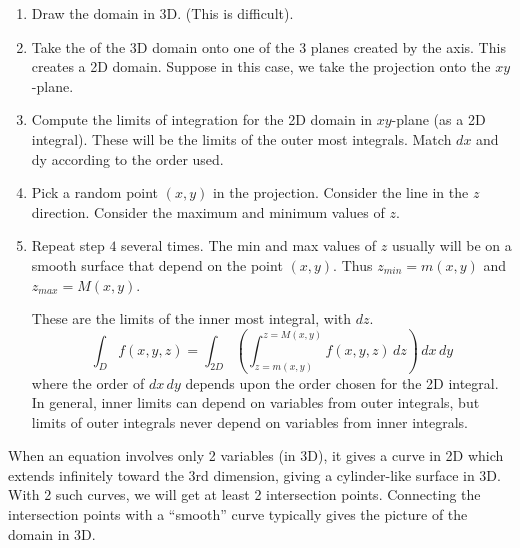 \documentclass[11pt,fleqn]{book} %
\begin{document}
\begin{enumerate}
    \item Draw the domain in 3D. (This is difficult). 

    \item Take the  of the 3D domain onto one of the 3 planes created by the axis. This creates a 2D domain. Suppose in this case, we take the projection onto the $xy$-plane.
    
    \item Compute the limits of integration for the 2D domain in $xy$-plane (as a 2D integral). These will be the limits of the outer most integrals. Match $dx$ and dy according to the order used. 
    
    \item Pick a random point $(x, y)$ in the projection. Consider the  line in the $z$ direction. Consider the maximum and minimum values of $z$. 
    
    \item Repeat step $4$ several times. The min and max values of $z$ usually will be on a smooth surface that depend on the point $(x, y)$. Thus $z_{min} = m(x, y)$ and $z_{max} = M(x, y)$.
    
    These are the limits of the inner most integral, with $dz$.
    $$\int_D f(x, y, z) = \int_{2D} \left( \int_{z=m(x,y)}^{z=M(x,y)} f(x, y, z) \,dz \right) \,dx \,dy$$
    where the order of $dx \,dy$ depends upon the order chosen for the 2D integral. In general, inner limits can depend on variables from outer integrals, but limits of outer integrals never depend on variables from inner integrals. 
\end{enumerate}

When an equation involves only 2 variables (in 3D), it gives a curve in 2D which extends infinitely toward the 3rd dimension, giving a cylinder-like surface in 3D. With 2 such curves, we will get at least 2 intersection points. Connecting the intersection points with a ``smooth'' curve typically gives the picture of the domain in 3D.
\end{document}
